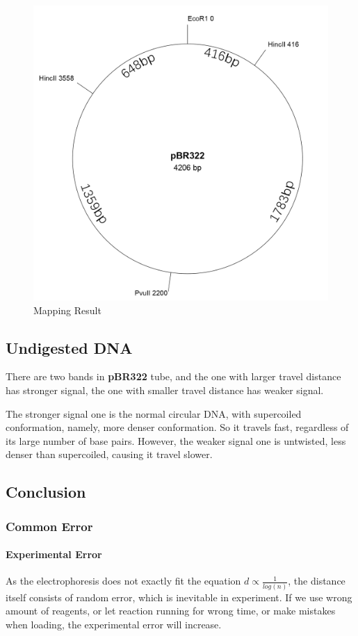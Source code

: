 \documentclass{article}
\begin{document}
            \begin{figure}[H]
                \centering
                \includegraphics[width = 0.5\linewidth]{../Data/Plasmid/final.png}
                \caption{Mapping Result}
                \label{final.map2}
            \end{figure}
        \subsection{Undigested DNA}
            There are two bands in \textbf{pBR322} tube, and the one with larger travel distance has stronger signal, the one with smaller travel distance has weaker signal. 

            The stronger signal one is the normal circular DNA, with supercoiled conformation, namely, more denser conformation. So it travels fast, regardless of its large number of base pairs. However, the weaker signal one is untwisted, less denser than supercoiled, causing it travel slower.

        \subsection{Conclusion}
            \subsubsection{Common Error}
                \paragraph{Experimental Error} As the electrophoresis does not exactly fit the equation $d \propto \frac{1}{log(n)}$, the distance itself consists of random error, which is inevitable in experiment. If we use wrong amount of reagents, or let reaction running for wrong time, or make mistakes when loading, the experimental error will increase.
\end{document}
